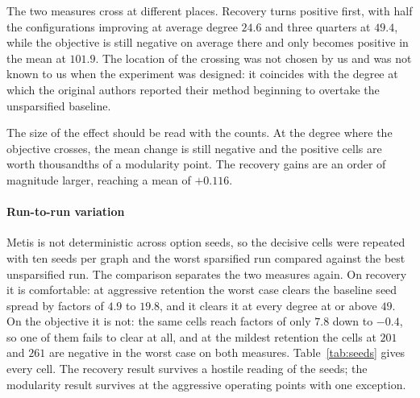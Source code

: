 The two measures cross at different places. Recovery turns positive first, with
half the configurations improving at average degree $24.6$ and three quarters at
$49.4$, while the objective is still negative on average there and only becomes
positive in the mean at $101.9$. The location of the crossing was not chosen by
us and was not known to us when the experiment was designed: it coincides with
the degree at which the original authors reported their method beginning to
overtake the unsparsified baseline.

The size of the effect should be read with the counts. At the degree where the
objective crosses, the mean change is still negative and the positive cells are
worth thousandths of a modularity point. The recovery gains are an order of
magnitude larger, reaching a mean of $+0.116$.

\paragraph{Run-to-run variation}
Metis is not deterministic across option seeds, so the decisive cells were
repeated with ten seeds per graph and the worst sparsified run compared against
the best unsparsified run. The comparison separates the two measures again. On
recovery it is comfortable: at aggressive retention the worst case clears the
baseline seed spread by factors of $4.9$ to $19.8$, and it clears it at every
degree at or above $49$. On the objective it is not: the same cells reach factors
of only $7.8$ down to $-0.4$, so one of them fails to clear at all, and at the
mildest retention the cells at $201$ and $261$ are negative in the worst case on
both measures. Table~\ref{tab:seeds} gives every cell. The recovery result
survives a hostile reading of the seeds; the modularity result survives at the
aggressive operating points with one exception.

